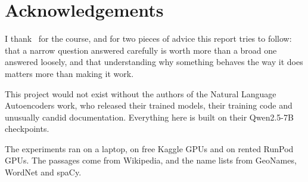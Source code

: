 \chapter*{Acknowledgements}

I thank \instructor\ for the course, and for two pieces of advice this report tries to follow: that a
narrow question answered carefully is worth more than a broad one answered loosely, and that understanding
why something behaves the way it does matters more than making it work.

This project would not exist without the authors of the Natural Language Autoencoders work, who released
their trained models, their training code and unusually candid documentation. Everything here is built on
their Qwen2.5-7B checkpoints.

The experiments ran on a laptop, on free Kaggle GPUs and on rented RunPod GPUs. The passages come from
Wikipedia, and the name lists from GeoNames, WordNet and spaCy.
